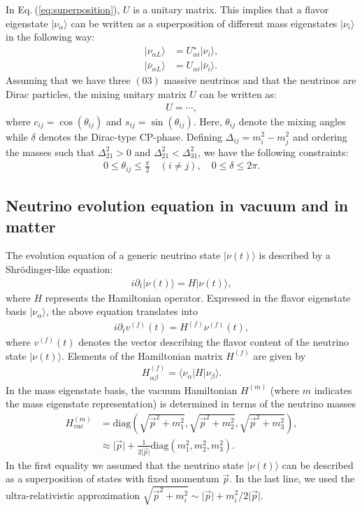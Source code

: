 \documentclass[twocolumn,secnumarabic,amssymb, nobibnotes, aps, prd,10pt]{revtex4-1}
\newcommand{\kt}[1]{\vert #1 \rangle}
\newcommand{\bkt}[3]{\langle #1 \vert #2 \vert #3 \rangle}
\newcommand{\Eq}[1]{Eq.$\:$(\ref{#1})}
\begin{document}
In \Eq{eq:superposition}, $U$ is a unitary matrix. This implies that a flavor eigenstate
$\kt{\nu_\alpha}$ can be written as a superposition of different mass eigenstates $\kt{\nu_i}$
in the following way:
\begin{align}
\kt{\nu_{\alpha L}} &= U^\star_{\alpha i} \kt{\nu_i}, \\
\kt{\bar{\nu}_{\alpha L}} &= U_{\alpha i} \kt{\bar{\nu}_i}.
\end{align}
Assuming that we have three $(03)$ massive neutrinos and that the neutrinos are Dirac
particles, the mixing unitary matrix $U$ can be written as:
\begin{align}
U = \cdots ,
\end{align}
where $c_{ij} = \cos(\theta_{ij})$ and $s_{ij} = \sin(\theta_{ij})$. Here, $\theta_{ij}$
denote the mixing angles while $\delta$ denotes the Dirac-type CP-phase. Defining 
$\Delta_{ij} = m_i^2 - m_j^2$ and ordering the masses such that $\Delta_{21}^2 > 0$
and $\Delta_{21}^2 < \Delta_{31}^2$, we have the following constraints:
\begin{align}
0 \leq \theta_{ij} \leq \frac{\pi}{2} \quad (i \neq j), \quad 0 \leq \delta \leq 2 \pi .
\end{align}


\subsection{Neutrino evolution equation in vacuum and in matter}
\label{subsec:evoleq}

The evolution equation of a generic neutrino state $\kt{\nu(t)}$ is described by a
Shrödinger-like equation:
\begin{align}
i \partial_t \kt{\nu(t)} = H \kt{\nu(t)},
\end{align}
where $H$ represents the Hamiltonian operator. Expressed in the flavor eigenstate
basis $\kt{\nu_\alpha}$, the above equation translates into
\begin{align}
i \partial_t v^{(f)}(t) = H^{(f)} \nu^{(f)}(t),
\end{align}
where $v^{(f)}(t)$ denotes the vector describing the flavor content of the neutrino state
$\kt{\nu(t)}$. Elements of the Hamiltonian matrix $H^{(f)}$ are given by
\begin{align}
H^{(f)}_{\alpha \beta} = \bkt{\nu_\alpha}{H}{\nu_\beta}.
\end{align}
In the mass eigenstate basis, the vacuum Hamiltonian $H^{(m)}$ (where $m$ indicates the
mass eigenstate representation) is determined in terms of the neutrino masses
\begin{align}
H^{(m)}_{vac} &= \mathrm{diag} \left( \sqrt{\vec{p}^2 + m_1^2}, \sqrt{\vec{p}^2 + m_2^2},
\sqrt{\vec{p}^2 + m_3^2} \right), \nonumber \\
&\approx \vert \vec{p} \vert + \frac{1}{2 \vert \vec{p} \vert} \mathrm{diag} \left( m_1^2, 
m_2^2, m_3^2 \right).
\end{align}
In the first equality we assumed that the neutrino state $\kt{\nu (t)}$ can be described
as a superposition of states with fixed momentum $\vec{p}$. In the last line, we used the
ultra-relativistic approximation $\sqrt{\vec{p}^2 + m_i^2} \sim \vert \vec{p} \vert + m_i^2
/2 \vert \vec{p} \vert$.



\end{document}
